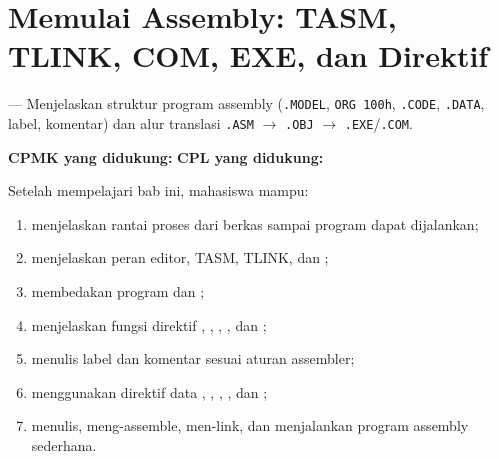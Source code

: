 \documentclass[../../main.tex]{subfiles}
\begin{document}
\chapter{Memulai Assembly: TASM, TLINK, COM, EXE, dan Direktif}
\label{chap:memulai-assembly}


\begin{subcpmkbox}
\vspace{1.1em}
 --- Menjelaskan struktur program assembly
(\texttt{.MODEL}, \texttt{ORG 100h}, \texttt{.CODE}, \texttt{.DATA},
label, komentar) dan alur translasi \texttt{.ASM} $\rightarrow$
\texttt{.OBJ} $\rightarrow$ \texttt{.EXE}/\texttt{.COM}.

\vspace{0.4em}
\textbf{CPMK yang didukung:}  \quad\textbullet\quad
\textbf{CPL yang didukung:} 
\end{subcpmkbox}

\begin{tujuanbox}
\vspace{1.1em}
Setelah mempelajari bab ini, mahasiswa mampu:
\begin{enumerate}
    \item menjelaskan rantai proses dari berkas  sampai
          program dapat dijalankan;
    \item menjelaskan peran editor, TASM, TLINK, dan ;
    \item membedakan program  dan ;
    \item menjelaskan fungsi direktif , ,
          , , dan ;
    \item menulis label dan komentar sesuai aturan assembler;
    \item menggunakan direktif data , , ,
          , dan ;
    \item menulis, meng-assemble, men-link, dan menjalankan program
          assembly sederhana.
\end{enumerate}
\end{tujuanbox}
\end{document}
